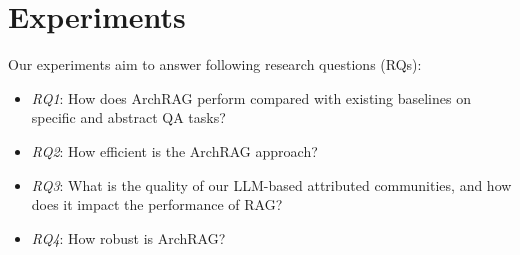 \section{Experiments}
\label{sec:exp}

Our experiments aim to answer following research questions (RQs):

\begin{itemize}
    \item {\it RQ1}: How does ArchRAG perform compared with existing baselines on specific and abstract QA tasks?
    \item {\it RQ2}: How efficient is the ArchRAG approach? 
    \item {\it RQ3}: What is the quality of our LLM-based attributed communities, and how does it impact the performance of RAG?
    \item {\it RQ4}: How robust is ArchRAG?
\end{itemize}



% 
